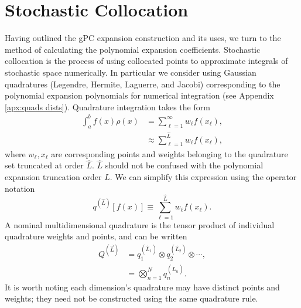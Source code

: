 \section{Stochastic Collocation}\label{sec:stoch coll}
Having outlined the gPC expansion construction and its uses, we turn to the method of calculating the polynomial
expansion coefficients.  Stochastic collocation is the process of using collocated points to approximate integrals 
of stochastic space
numerically.  In particular we consider using Gaussian quadratures (Legendre, Hermite, Laguerre, and Jacobi)
corresponding to the polynomial expansion polynomials for numerical integration (see Appendix \ref{apx:quads
dists}).  Quadrature integration takes
the form
\begin{align}
  \int_a^b f(x)\rho(x) &= \sum_{\ell=1}^\infty w_\ell f(x_\ell),\\
  &\approx \sum_{\ell=1}^{\hat L} w_\ell f(x_\ell),
\end{align}
where $w_\ell,x_\ell$ are corresponding points and weights belonging to the quadrature set truncated at order
$\hat L$.  $\hat L$ should not be confused with the polynomial expansion truncation order $L$.  We
can simplify this expression using the operator notation
\begin{equation}\label{eq:quad op}
  q^{(\hat L)}[f(x)] \equiv \sum_{\ell=1}^{\hat L} w_\ell f(x_\ell).
\end{equation}
A nominal multidimensional quadrature is the tensor product of
individual quadrature weights and points, and can be written
\begin{align}
  Q^{(\vec{L})} &= q^{(\hat L_1)}_1 \otimes q^{(\hat L_2)}_2 \otimes \cdots,\\
                     &= \bigotimes_{n=1}^N q^{(\hat L_n)}_n.
\end{align}
It is worth noting each dimension's quadrature may have distinct points and weights; they need not be constructed using
the same quadrature rule.

